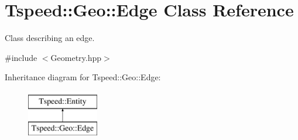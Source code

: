 \hypertarget{classTspeed_1_1Geo_1_1Edge}{\section{Tspeed\-:\-:Geo\-:\-:Edge Class Reference}
\label{classTspeed_1_1Geo_1_1Edge}
}


Class describing an edge.  




{\ttfamily \#include $<$Geometry.\-hpp$>$}

Inheritance diagram for Tspeed\-:\-:Geo\-:\-:Edge\-:\begin{figure}[H]
\begin{center}
\leavevmode
\includegraphics[height=2.000000cm]{classTspeed_1_1Geo_1_1Edge}
\end{center}
\end{figure}
